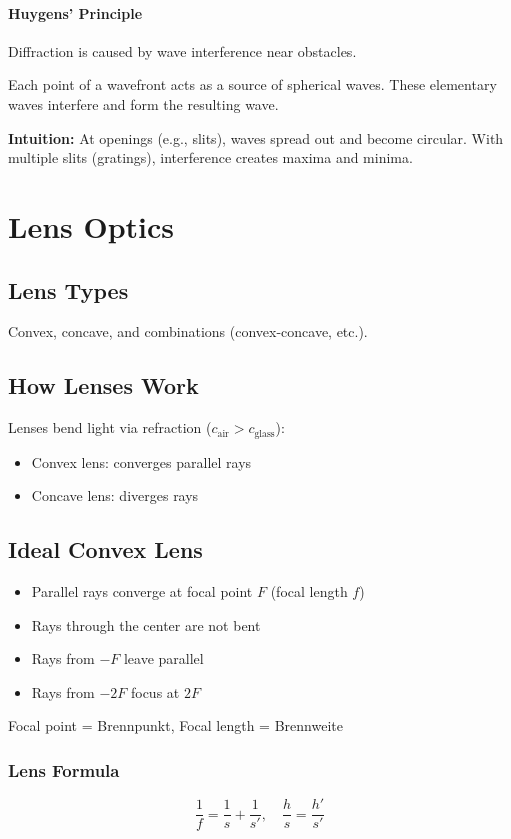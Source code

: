 \documentclass{article}
\begin{document}
\paragraph{Huygens' Principle}
Diffraction is caused by wave interference near obstacles.

Each point of a wavefront acts as a source of spherical waves. These elementary waves interfere and form the resulting wave.

\textbf{Intuition:}
At openings (e.g., slits), waves spread out and become circular. With multiple slits (gratings), interference creates maxima and minima.

\section{Lens Optics}

\subsection{Lens Types}
Convex, concave, and combinations (convex-concave, etc.).

\subsection{How Lenses Work}
Lenses bend light via refraction ($c_{\text{air}} > c_{\text{glass}}$):
\begin{itemize}
  \item Convex lens: converges parallel rays
  \item Concave lens: diverges rays
\end{itemize}

\subsection{Ideal Convex Lens}
\begin{itemize}
  \item Parallel rays converge at focal point $F$ (focal length $f$)
  \item Rays through the center are not bent
  \item Rays from $-F$ leave parallel
  \item Rays from $-2F$ focus at $2F$
\end{itemize}

Focal point = Brennpunkt, \quad Focal length = Brennweite

\subsubsection{Lens Formula}
\[
\frac{1}{f} = \frac{1}{s} + \frac{1}{s'}, 
\quad 
\frac{h}{s} = \frac{h'}{s'}
\]
\end{document}
